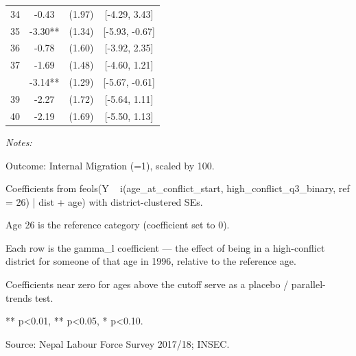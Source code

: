 \begin{table}[!h]
\begin{threeparttable}
\begin{tabular}[t]{cccc}
34 & -0.43 & (1.97) & {}[-4.29, 3.43]\\
35 & -3.30** & (1.34) & {}[-5.93, -0.67]\\
36 & -0.78 & (1.60) & {}[-3.92, 2.35]\\
37 & -1.69 & (1.48) & {}[-4.60, 1.21]\\
\addlinespace
38 & -3.14** & (1.29) & {}[-5.67, -0.61]\\
39 & -2.27 & (1.72) & {}[-5.64, 1.11]\\
40 & -2.19 & (1.69) & {}[-5.50, 1.13]\\
\bottomrule
\end{tabular}
\begin{tablenotes}
\item \textit{Notes:} 
\item Outcome: Internal Migration (=1), scaled by 100.
\item Coefficients from feols(Y ~ i(age_at_conflict_start, high_conflict_q3_binary, ref = 26) | dist + age) with district-clustered SEs.
\item Age 26 is the reference category (coefficient set to 0).
\item Each row is the gamma_l coefficient — the effect of being in a high-conflict district for someone of that age in 1996, relative to the reference age.
\item Coefficients near zero for ages above the cutoff serve as a placebo / parallel-trends test.
\item *** p<0.01, ** p<0.05, * p<0.10.
\item Source: Nepal Labour Force Survey 2017/18; INSEC.
\end{tablenotes}
\end{threeparttable}
\end{table}
